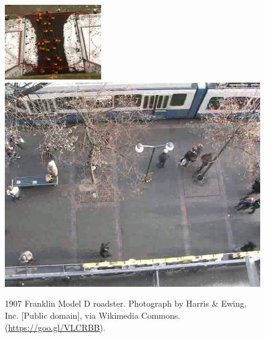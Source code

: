 \begin{figure}[h]
  \centering
  \includegraphics[width=0.40\linewidth]{./figures/image-biwi.png}
  \includegraphics[width=0.40\linewidth]{./figures/biwi-hotel.png}
  \caption{1907 Franklin Model D roadster. Photograph by Harris \&
    Ewing, Inc. [Public domain], via Wikimedia
    Commons. (\url{https://goo.gl/VLCRBB}).}\label{fig:eth-dataset-scenes}
\end{figure}

